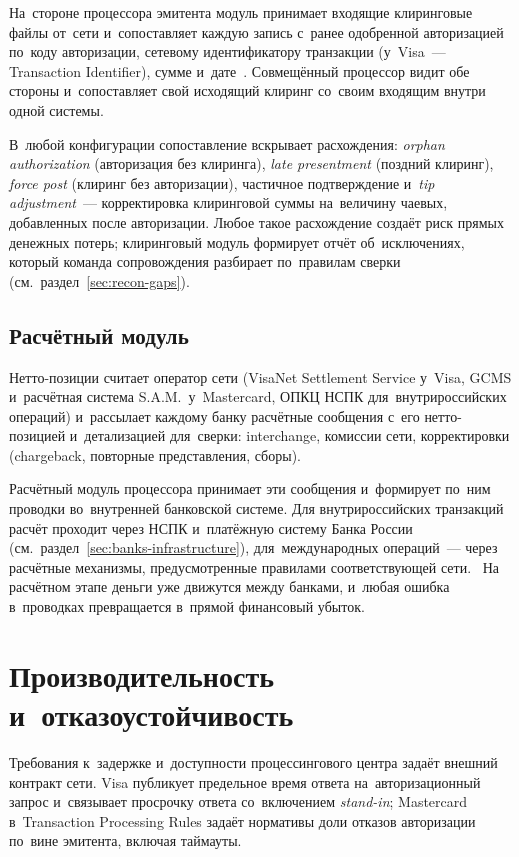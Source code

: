 На~стороне процессора эмитента модуль принимает входящие клиринговые файлы от~сети
и~сопоставляет каждую запись с~ранее одобренной авторизацией по~коду
авторизации, сетевому идентификатору транзакции (у~Visa~--- Transaction
Identifier), сумме и~дате~\cite{visa-core-rules}. Совмещённый процессор видит обе стороны и~сопоставляет свой
исходящий клиринг со~своим входящим внутри одной системы.

В~любой конфигурации сопоставление вскрывает расхождения: \textit{orphan
authoriza\-tion} (авторизация без клиринга), \textit{late presentment} (поздний
клиринг), \textit{force post} (клиринг без авторизации), частичное
подтверждение и~\textit{tip adjustment}~--- корректировка клиринговой суммы
на~величину чаевых, добавленных после авторизации. Любое такое расхождение
создаёт риск прямых денежных потерь; клиринговый модуль формирует отчёт
об~исключениях, который команда сопровождения разбирает по~правилам сверки
(см.~раздел~\ref{sec:recon-gaps}).

\subsection*{Расчётный модуль}

Нетто-позиции считает оператор сети (VisaNet Settlement Service у~Visa, GCMS и~расчётная система S.A.M.\ у~Mastercard, ОПКЦ
НСПК для~внутрироссийских операций) и~рассылает каждому банку расчётные
сообщения с~его нетто-позицией и~детализацией для~сверки: interchange, комиссии сети, корректировки (chargeback, повторные
представления, сборы).

Расчётный модуль процессора принимает эти сообщения и~формирует по~ним
проводки во~внутренней банковской системе. Для внутрироссийских транзакций
расчёт проходит через НСПК и~платёжную систему Банка России
(см.~раздел~\ref{sec:banks-infrastructure}), для~международных операций~---
через расчётные механизмы, предусмотренные правилами соответствующей
сети.~\cite{cbr-ps,visa-core-rules,mc-switching-services,mc-gcms-rm-2021} На расчётном этапе
деньги уже движутся между банками, и~любая ошибка в~проводках превращается
в~прямой финансовый убыток.

\section{Производительность и~отказоустойчивость}\label{sec:pc-performance}

Требования к~задержке и~доступности процессингового центра задаёт внешний
контракт сети. Visa публикует предельное время ответа на~авторизационный
запрос и~связывает просрочку ответа со~включением \textit{stand-in};
Mastercard в~Transaction Processing Rules задаёт нормативы доли отказов
авторизации по~вине эмитента, включая таймауты.~\cite{visa-core-rules,mc-tpr}

